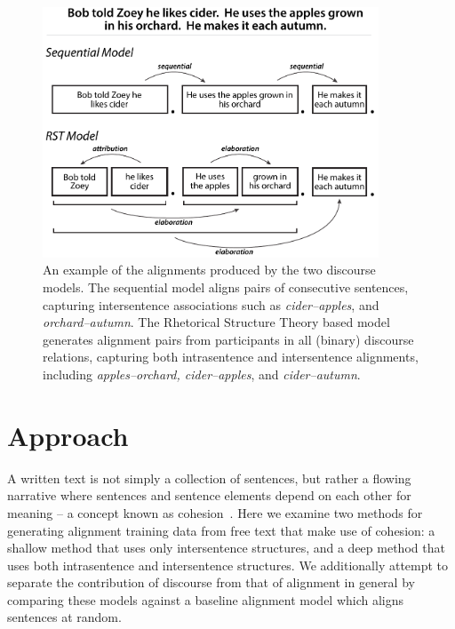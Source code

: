 \begin{figure}[t!]
\begin{center}
\includegraphics[width=100mm]{mainmatter/naacl2015-alignment/rst2a.pdf}
\caption{{\small An example of the alignments produced by the two discourse models.  The sequential model aligns pairs of consecutive sentences, capturing intersentence associations such as \emph{cider--apples}, and \emph{orchard--autumn}.  The Rhetorical Structure Theory based model generates alignment pairs from participants in all (binary) discourse relations, capturing both intrasentence and intersentence alignments, including 
\emph{apples--orchard, cider--apples}, and \emph{cider--autumn}.}}
\label{fig:examples}
\end{center}
\end{figure}

\section{Approach}
\label{sec-naacl2015:approach}

A written text is not simply a collection of sentences, but rather a flowing narrative where sentences and sentence elements depend on each other for meaning -- a concept known as cohesion~\citep{halliday2014cohesion}.  
Here we examine two methods for generating alignment training data from free text that make use of cohesion: a shallow method that uses only intersentence structures, and a deep method that uses both intrasentence and intersentence structures.
We additionally attempt to separate the contribution of discourse from that of alignment in general by comparing these models against a baseline alignment model which aligns sentences at random.

